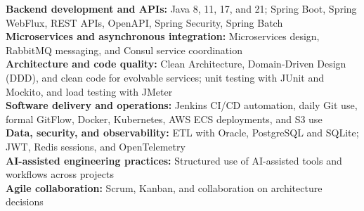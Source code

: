 \textbf{Backend development and APIs:} Java 8, 11, 17, and 21; Spring Boot, Spring WebFlux, REST APIs, OpenAPI, Spring Security, Spring Batch\\
\textbf{Microservices and asynchronous integration:} Microservices design, RabbitMQ messaging, and Consul service coordination\\
\textbf{Architecture and code quality:} Clean Architecture, Domain-Driven Design (DDD), and clean code for evolvable services; unit testing with JUnit and Mockito, and load testing with JMeter\\
\textbf{Software delivery and operations:} Jenkins CI/CD automation, daily Git use, formal GitFlow, Docker, Kubernetes, AWS ECS deployments, and S3 use\\
\textbf{Data, security, and observability:} ETL with Oracle, PostgreSQL and SQLite; JWT, Redis sessions, and OpenTelemetry\\
\textbf{AI-assisted engineering practices:} Structured use of AI-assisted tools and workflows across projects\\
\textbf{Agile collaboration:} Scrum, Kanban, and collaboration on architecture decisions\\
